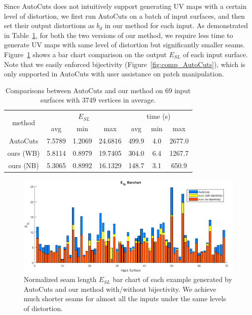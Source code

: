 Since AutoCuts does not intuitively support generating UV maps with a certain level of distortion, we first run AutoCuts on a batch of input surfaces, and then set their output distortions as $b_d$ in our method for each input. As demonstrated in Table~\ref{tb:comp_AutoCuts}, for both the two versions of our method, we require less time to generate UV maps with same level of distortion but significantly smaller seams. Figure~\ref{fig:ESLBar_compAutoCuts} shows a bar chart comparison on the output $E_{SL}$ of each input surface. Note that we easily enforced bijectivity (Figure~\ref{fig:comp_AutoCuts}), which is only supported in AutoCuts with user assistance on patch manipulation.

\begin{table}[!h]
\centering
\caption{Comparisons between AutoCuts and our method on 69 input surfaces with $3749$ vertices in average.}
\label{tb:comp_AutoCuts}
\begin{tabular}{|c|ccc|ccc|}
\hline
\multirow{2}{*}{method} & \multicolumn{3}{c|}{$E_{SL}$} & \multicolumn{3}{c|}{time (s)} \\ \cline{2-7} 
                        & avg      & min     & max      & avg      & min    & max       \\ \hline
AutoCuts                & 7.5789   & 1.2069  & 24.6816  & 499.9    & 4.0    & 2677.0    \\
ours (WB)               & 5.8114   & 0.8979  & 19.7405  & 304.0    & 6.4    & 1267.7     \\
ours (NB)               & 5.3065   & 0.8992  & 16.1329  & 148.7    & 3.1    & 650.9    \\ \hline
\end{tabular}
\end{table}

\begin{figure}[!h]
\centering
\includegraphics[width=\linewidth]{fig/ESLBar_compAutoCuts.png}
\caption{Normalized seam length $E_{SL}$ bar chart of each example generated by AutoCuts and our method with/without bijectivity. We achieve much shorter seams for almost all the inputs under the same levels of distortion.}
\label{fig:ESLBar_compAutoCuts}
\end{figure}

